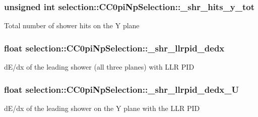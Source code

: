 \subsubsection[{\texorpdfstring{\+\_\+shr\+\_\+hits\+\_\+y\+\_\+tot}{_shr_hits_y_tot}}]{\setlength{\rightskip}{0pt plus 5cm}unsigned int selection\+::\+C\+C0pi\+Np\+Selection\+::\+\_\+shr\+\_\+hits\+\_\+y\+\_\+tot\hspace{0.3cm}{\ttfamily [private]}}\hypertarget{classselection_1_1CC0piNpSelection_a6a43c3523af47860ad1682ebe14bb8e3}{}\label{classselection_1_1CC0piNpSelection_a6a43c3523af47860ad1682ebe14bb8e3}
Total number of shower hits on the Y plane 
\subsubsection[{\texorpdfstring{\+\_\+shr\+\_\+llrpid\+\_\+dedx}{_shr_llrpid_dedx}}]{\setlength{\rightskip}{0pt plus 5cm}float selection\+::\+C\+C0pi\+Np\+Selection\+::\+\_\+shr\+\_\+llrpid\+\_\+dedx\hspace{0.3cm}{\ttfamily [private]}}\hypertarget{classselection_1_1CC0piNpSelection_a69fe01c749c1be00582e7c1cf27ced22}{}\label{classselection_1_1CC0piNpSelection_a69fe01c749c1be00582e7c1cf27ced22}
d\+E/dx of the leading shower (all three planes) with L\+LR P\+ID 
\subsubsection[{\texorpdfstring{\+\_\+shr\+\_\+llrpid\+\_\+dedx\+\_\+U}{_shr_llrpid_dedx_U}}]{\setlength{\rightskip}{0pt plus 5cm}float selection\+::\+C\+C0pi\+Np\+Selection\+::\+\_\+shr\+\_\+llrpid\+\_\+dedx\+\_\+U\hspace{0.3cm}{\ttfamily [private]}}\hypertarget{classselection_1_1CC0piNpSelection_a30e6e7359995cc9ddb52db719cd4064e}{}\label{classselection_1_1CC0piNpSelection_a30e6e7359995cc9ddb52db719cd4064e}
d\+E/dx of the leading shower on the Y plane with the L\+LR P\+ID 

